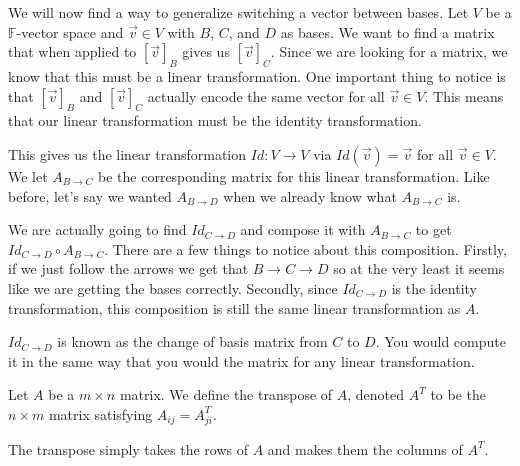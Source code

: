 \begin{example}
    We will now find a way to generalize switching a vector between bases. Let $V$ be a $\mathbb{F}$-vector space and $\vec{v}\in V$ with $B$, $C$, and $D$ as bases. We want to find a matrix that when applied to $[\vec{v}]_B$ gives us $[\vec{v}]_C$. Since we are looking for a matrix, we know that this must be a linear transformation. One important thing to notice is that $[\vec{v}]_B$ and $[\vec{v}]_C$ actually encode the same vector for all $\vec{v}\in V$. This means that our linear transformation must be the identity transformation.

    This gives us the linear transformation $Id:V\to V$ via $Id(\vec{v})=\vec{v}$ for all $\vec{v}\in V$. We let $A_{B\to C}$ be the corresponding matrix for this linear transformation. Like before, let's say we wanted $A_{B\to D}$ when we already know what $A_{B\to C}$ is.

    We are actually going to find $Id_{C\to D}$ and compose it with $A_{B\to C}$ to get $Id_{C\to D}\circ A_{B\to C}$. There are a few things to notice about this composition. Firstly, if we just follow the arrows we get that $B\to C\to D$ so at the very least it seems like we are getting the bases correctly. Secondly, since $Id_{C\to D}$ is the identity transformation, this composition is still the same linear transformation as $A$.

    $Id_{C\to D}$ is known as the change of basis matrix from $C$ to $D$. You would compute it in the same way that you would the matrix for any linear transformation.
\end{example}
\begin{definition}
    Let $A$ be a $m\times n$ matrix. We define the transpose of $A$, denoted $A^T$ to be the $n\times m$ matrix satisfying $A_{ij}=A^T_{ji}$.
\end{definition}
\begin{remark}
    The transpose simply takes the rows of $A$ and makes them the columns of $A^T$.
\end{remark}
